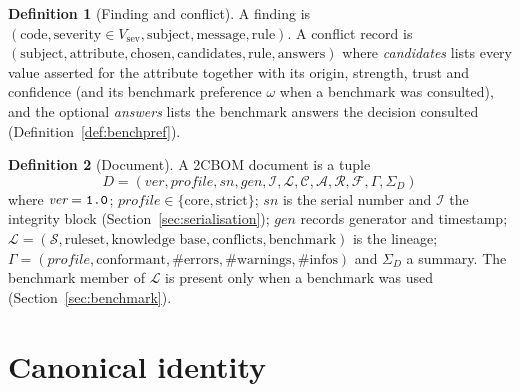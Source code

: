 \documentclass[11pt,a4paper]{article}
\newcommand{\codem}[1]{\texttt{\detokenize{#1}}}
\newcommand{\twocbom}{2CBOM}
\newcommand{\Assets}{\mathcal{A}}
\newcommand{\Comps}{\mathcal{C}}
\newcommand{\Rels}{\mathcal{R}}
\newcommand{\Srcs}{\mathcal{S}}
\newcommand{\Finds}{\mathcal{F}}
\theoremstyle{definition}
\newtheorem{definition}{Definition}[section]
\theoremstyle{plain}
\begin{document}
\begin{definition}[Finding and conflict]
A finding is $(\text{code}, \text{severity} \in V_{\mathrm{sev}}, \text{subject}, \text{message},
\text{rule})$. A conflict record is $(\text{subject}, \text{attribute}, \text{chosen},
\text{candidates}, \text{rule}, \text{answers})$ where \emph{candidates} lists every value asserted for the
attribute together with its origin, strength, trust and confidence (and its benchmark preference
$\omega$ when a benchmark was consulted), and the optional \emph{answers} lists the benchmark answers
the decision consulted (Definition~\ref{def:benchpref}).
\end{definition}

\begin{definition}[Document]\label{def:document}
A \twocbom{} document is a tuple
$$D = (\textit{ver}, \textit{profile}, \textit{sn}, \textit{gen}, \mathcal{I}, \mathcal{L},
\Comps, \Assets, \Rels, \Finds, \Gamma, \Sigma_D)$$
where $\textit{ver}=\codem{1.0}$;
$\textit{profile} \in \{\text{core}, \text{strict}\}$; $\textit{sn}$ is the serial number and
$\mathcal{I}$ the integrity block (Section~\ref{sec:serialisation}); $\textit{gen}$ records
generator and timestamp; $\mathcal{L} = (\Srcs, \text{ruleset},\allowbreak \text{knowledge base},\allowbreak
\text{conflicts},\allowbreak \text{benchmark})$ is the lineage; $\Gamma = (\textit{profile}, \text{conformant},
\#\text{errors}, \#\text{warnings}, \#\text{infos})$ and $\Sigma_D$ a summary. The benchmark member
of $\mathcal{L}$ is present only when a benchmark was used (Section~\ref{sec:benchmark}).
\end{definition}

\section{Canonical identity}\label{sec:identity}
\end{document}
